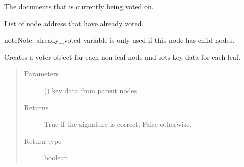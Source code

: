 \documentclass[letterpaper,10pt,english]{sphinxmanual}
\begin{document}
\begin{fulllineitems}

\begin{fulllineitems}
\label{\detokenize{index:ThresTree.TreeNode.current_vote}}
 \textendash{} The documents that is currently being voted on.

\end{fulllineitems}


\begin{fulllineitems}
\label{\detokenize{index:ThresTree.TreeNode.already_voted}}
 \textendash{} List of node address that have already voted.

\end{fulllineitems}


\begin{sphinxadmonition}{note}{Note:}
already\_voted variable is only used if this node has child nodes.
\end{sphinxadmonition}

\begin{fulllineitems}
\label{\detokenize{index:ThresTree.TreeNode.finalize}}
Creates a voter object for each non-leaf node and sets key data for each leaf.
\begin{quote}\begin{description}
\item[{Parameters}] \leavevmode
{} (\sphinxstyleliteralemphasis{, }) \textendash{} key data from parent nodes

\item[{Returns}] \leavevmode
True if the signature is correct, False otherwise.

\item[{Return type}] \leavevmode
boolean

\end{description}\end{quote}

\end{fulllineitems}



\end{fulllineitems}
\end{document}
